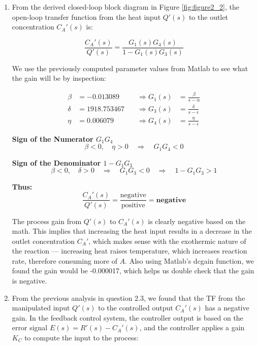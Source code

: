\documentclass[12pt]{article}
\begin{document}
\begin{enumerate}
\begin{enumerate}
    \item From the derived closed-loop block diagram in Figure \ref{fig:figure2_2}, the open-loop transfer function from the heat input \(Q'(s)\) to the outlet concentration \(C_A'(s)\) is:

    \[
    \frac{C_A'(s)}{Q'(s)} = \frac{G_1(s) G_4(s)}{1 - G_1(s) G_3(s)}
    \]
    
    We use the previously computed parameter values from Matlab to see what the gain will be by inspection:
    
    \[
    \begin{aligned}
    \beta &= -0.013089 \quad &\Rightarrow G_1(s) &= \frac{\beta}{s - \alpha} \\
    \delta &= 1918.753467 \quad &\Rightarrow G_3(s) &= \frac{\delta}{s - \epsilon} \\
    \eta &= 0.006079 \quad &\Rightarrow G_4(s) &= \frac{\eta}{s - \epsilon}
    \end{aligned}
    \]
    
    \medskip
    
    \noindent\textbf{Sign of the Numerator \(G_1 G_4\)}  
    \[
    \beta < 0, \quad \eta > 0 \quad \Rightarrow \quad G_1 G_4 < 0
    \]
    
    \noindent\textbf{Sign of the Denominator \(1 - G_1 G_3\)}  
    \[
    \beta < 0, \quad \delta > 0 \quad \Rightarrow \quad G_1 G_3 < 0 \quad \Rightarrow \quad 1 - G_1 G_3 > 1
    \]
    
    \noindent\textbf{Thus:}
    \[
    \frac{C_A'(s)}{Q'(s)} = \frac{\text{negative}}{\text{positive}} = \textbf{negative}
    \]
    
    \medskip
    
    \noindent The process gain from \(Q'(s)\) to \(C_A'(s)\) is clearly negative based on the math. This implies that increasing the heat input results in a decrease in the outlet concentration \(C_A'\), which makes sense with the exothermic nature of the reaction — increasing heat raises temperature, which increases reaction rate, therefore consuming more of \(A\). Also using Matlab's dcgain function, we found the gain would be -0.000017, which helps us double check that the gain is negative.

    \item From the previous analysis in question 2.3, we found that the TF from the manipulated input \(Q'(s)\) to the controlled output \(C_A'(s)\) has a negative gain. In the feedback control system, the controller output is based on the error signal \(E(s) = R'(s) - C_A'(s)\), and the controller applies a gain \(K_C\) to compute the input to the process:
    

\end{enumerate}
\end{enumerate}
\end{document}
